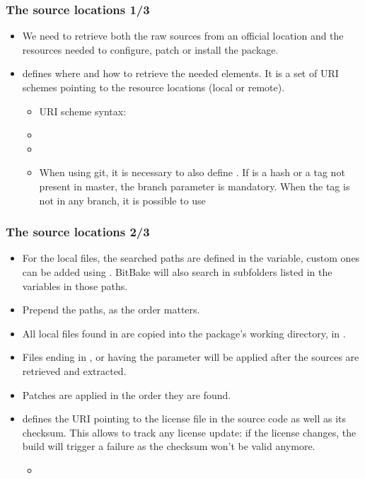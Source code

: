 \begin{frame}
  \frametitle{The source locations 1/3}
  \begin{itemize}
    \item We need to retrieve both the raw sources from an official
      location and the resources needed to configure, patch or install
      the package.
    \item {} defines where and how to retrieve the
      needed elements. It is a set of URI schemes pointing to the
      resource locations (local or remote).
      \begin{itemize}
        \item URI scheme syntax: 
        \item {}
        \item
        \item
          When using git, it is necessary to also define
          . If  is a hash or a tag not
          present in master, the branch parameter is mandatory. When
          the tag is not in any branch, it is possible to use
      \end{itemize}
  \end{itemize}
\end{frame}

\begin{frame}
  \frametitle{The source locations 2/3}
  \begin{itemize}
    \item For the local files, the searched paths are defined in the
       variable, custom ones can be added using
      . BitBake will also search in subfolders
      listed in the  variables in those paths.
    \item Prepend the paths, as the order matters.
    \item All local files found in  are copied into the
      package's working directory, in .
    \item Files ending in ,  or having the
       parameter will be applied after the sources are
      retrieved and extracted.
    \item Patches are applied in the order they are found.
    \item {} defines the URI pointing to the
      license file in the source code as well as its checksum. This
      allows to track any license update: if the license changes, the
      build will trigger a failure as the checksum won't be valid
      anymore.
      \begin{itemize}
        \item {}
      \end{itemize}
  \end{itemize}
\end{frame}


